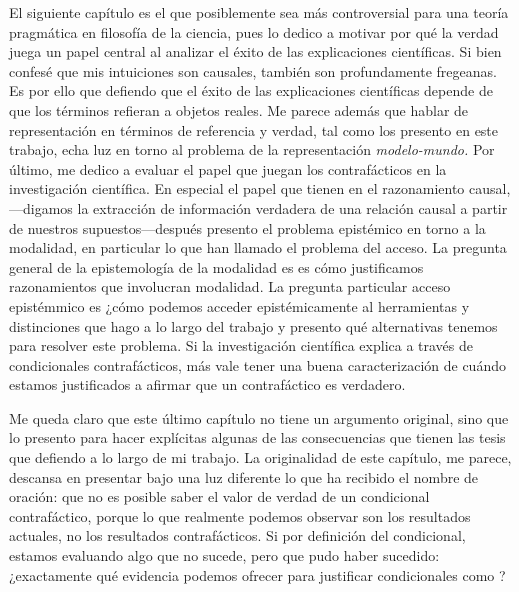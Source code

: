 {El siguiente capítulo es el que posiblemente sea más
controversial para una teoría pragmática en filosofía de la
ciencia, pues lo dedico a motivar por qué la verdad juega un
papel central al analizar el éxito de las explicaciones
científicas. Si bien confesé que mis intuiciones son
causales, también son profundamente fregeanas. Es por ello
que defiendo que el éxito de las explicaciones científicas
depende de que los términos refieran a objetos reales. Me
parece además que hablar de representación en términos de
referencia y verdad, tal como los presento en este trabajo,
echa luz en torno al problema de la representación
\emph{modelo-mundo.} Por último, me dedico a evaluar el papel que juegan los
contrafácticos en la investigación científica. En especial
el papel que tienen en el razonamiento causal,---digamos la
extracción de información verdadera de una relación causal a partir de nuestros
supuestos---después presento el problema epistémico en
torno a la modalidad, en particular lo que  han llamado el
problema del acceso. La pregunta general de la epistemología
de la modalidad es es cómo justificamos razonamientos que involucran
modalidad. La pregunta particular acceso
epistémmico es ¿cómo podemos acceder epistémicamente al
herramientas y distinciones que hago a lo largo del trabajo
y presento qué alternativas tenemos para resolver este
problema. Si la investigación científica explica a través de
condicionales contrafácticos, más vale tener una buena
caracterización de cuándo estamos justificados a afirmar que
un contrafáctico es verdadero.

Me queda claro que este
último capítulo no tiene un argumento original, sino que lo
presento para hacer explícitas algunas de las consecuencias
que tienen las tesis que defiendo a lo largo de mi trabajo.
La originalidad de este capítulo, me parece, descansa en
presentar bajo una luz diferente lo que ha recibido el nombre de 
oración: que no es posible saber el valor de verdad de un
condicional contrafáctico, porque lo que realmente podemos
observar son los resultados actuales, no los resultados
contrafácticos. Si por definición del condicional, estamos
evaluando algo que no sucede, pero que pudo haber sucedido:
¿exactamente qué evidencia podemos ofrecer para justificar
condicionales como ?

}
